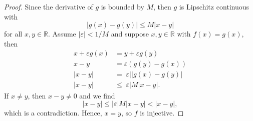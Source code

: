 \documentclass[12pt]{article}
\theoremstyle{definition}
\newcommand{\R}{\mathbb{R}}
\newcommand{\eps}{\varepsilon}
\begin{document}
\begin{proof}
    Since the derivative of $g$ is bounded by $M$, then $g$ is Lipschitz continuous with 
    \[
        |g(x) - g(y)| \leq M|x - y|
    \]
    for all $x, y \in \R$. Assume $|\eps| < 1/M$ and suppose $x, y \in \R$ with $f(x) = g(x)$, then
    \begin{align*}
        x + \eps g(x) &= y + \eps g(y) \\
        x - y &= \eps(g(y) - g(x)) \\
        |x - y| &= |\eps| |g(x) - g(y)| \\
        |x - y| &\leq |\eps| M |x - y|.
    \end{align*}
    If $x \ne y$, then $x - y \ne 0$ and we find
    \[
        |x - y| \leq |\eps| M |x - y| < |x - y|,
    \]
    which is a contradiction. Hence, $x = y$, so $f$ is injective.
    
\end{proof}
\end{document}
